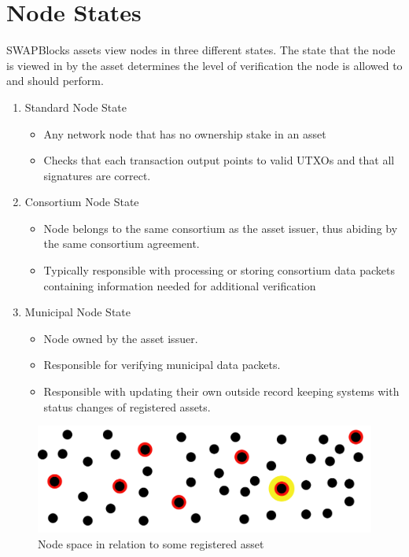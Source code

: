 \documentclass[12pt]{article}
\begin{document}
\section{Node States}

SWAPBlocks assets view nodes in three different states. The state that the node is viewed in 
by the asset determines the level of verification the node is allowed to and should
perform.


\begin{enumerate}
	\item Standard Node State
		\begin{itemize}
			\item{Any network node that has no ownership stake in an asset}
			\item{Checks that each transaction output points to valid UTXOs
				and that all signatures are correct.}
		\end{itemize}
	\item Consortium Node State
		\begin{itemize}
			\item{Node belongs to the same consortium as the asset issuer,
				thus abiding by the same consortium agreement.}
			\item{Typically responsible with processing  or storing
				consortium data packets containing information 
				needed for additional verification}
		\end{itemize}
	\item Municipal Node State
		\begin{itemize}
			\item{Node owned by the asset issuer.}
			\item{Responsible for verifying municipal data packets.}
			\item{Responsible with updating their own outside record keeping systems 
				with status changes of registered assets.}	
		\end{itemize}
\end{enumerate}

\begin{figure}[h]
	\centering
	\includegraphics[width=.85\textwidth]{node_space}
	\caption{Node space in relation to some registered asset}
	\label{fig:nodespace1}
\end{figure}
\end{document}

